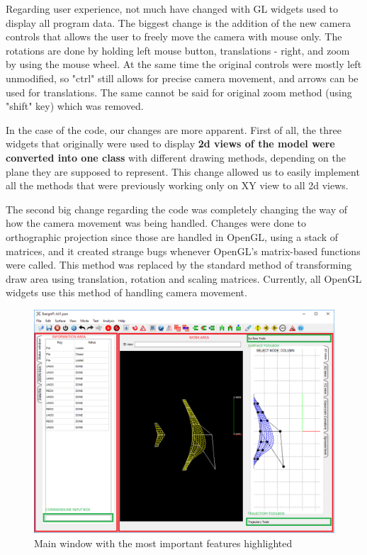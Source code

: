 \documentclass[a4paper, 11pt, article]{report}
\begin{document}
Regarding user experience, not much have changed with GL widgets used to display all program data. The biggest change is the addition of the new camera controls that allows the user to freely move the camera with mouse only. The rotations are done by holding left mouse button, translations - right, and zoom by using the mouse wheel. At the same time the original controls were mostly left unmodified, so "ctrl" still allows for precise camera movement, and arrows can be used for translations. The same cannot be said for original zoom method (using "shift" key) which was removed.

In the case of the code, our changes are more apparent. First of all, the three widgets that originally were used to display \textbf{2d views of the model were converted into one class} with different drawing methods, depending on the plane they are supposed to represent. This change allowed us to easily implement all the methods that were previously working only on XY view to all 2d views. 

The second big change regarding the code was completely changing the way of how the camera movement was being handled. Changes were done to orthographic projection since those are handled in OpenGL, using a stack of matrices, and it created strange bugs whenever OpenGL's matrix-based functions were called. This method was replaced by the standard method of transforming draw area using translation, rotation and scaling matrices. Currently, all OpenGL widgets use this method of handling camera movement.

\begin{figure}[!h]
	\centering
	
	\includegraphics[width=\textwidth]{images/main_window.png}
	
	\caption{Main window with the most important features highlighted}
	
	\label{gui_surface}
\end{figure}
\end{document}

